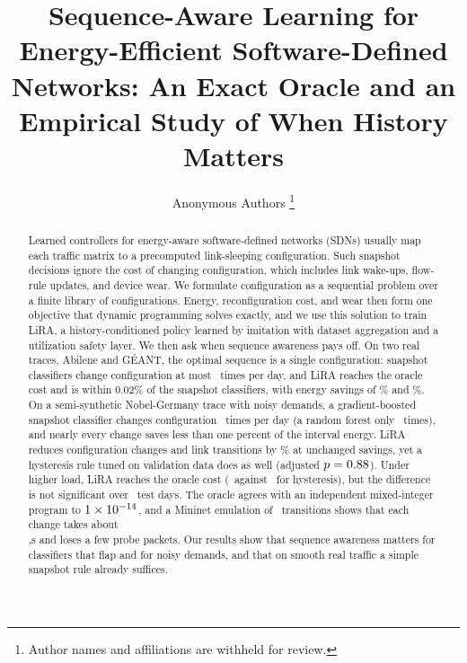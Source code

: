 \documentclass[journal]{IEEEtran}
\begin{document}
\title{Sequence-Aware Learning for Energy-Efficient Software-Defined Networks: An Exact Oracle and an Empirical Study of When History Matters}

\author{Anonymous Authors%
\thanks{Author names and affiliations are withheld for review.}}


\maketitle
\IEEEpeerreviewmaketitle

\begin{abstract}
Learned controllers for energy-aware software-defined networks (SDNs) usually map each traffic matrix to a precomputed link-sleeping configuration. Such snapshot decisions ignore the cost of changing configuration, which includes link wake-ups, flow-rule updates, and device wear. We formulate configuration as a sequential problem over a finite library of configurations. Energy, reconfiguration cost, and wear then form one objective that dynamic programming solves exactly, and we use this solution to train LiRA, a history-conditioned policy learned by imitation with dataset aggregation and a utilization safety layer. We then ask when sequence awareness pays off. On two real traces, Abilene and G\'{E}ANT, the optimal sequence is a single configuration: snapshot classifiers change configuration at most \abiBFourchg\ times per day, and LiRA reaches the oracle cost and is within 0.02\% of the snapshot classifiers, with energy savings of \abiSav\% and \geaSav\%. On a semi-synthetic Nobel-Germany trace with noisy demands, a gradient-boosted snapshot classifier changes configuration \nobBFourchg\ times per day (a random forest only \modRfChg\ times), and nearly every change saves less than one percent of the interval energy. LiRA reduces configuration changes and link transitions by \nobY\% at unchanged savings, yet a hysteresis rule tuned on validation data does as well (adjusted $p=0.88$). Under higher load, LiRA reaches the oracle cost (\nobhlJLiRA\ against \nobhlJBSix\ for hysteresis), but the difference is not significant over \nobTestDays\ test days. The oracle agrees with an independent mixed-integer program to $1\times10^{-14}$, and a Mininet emulation of \emuTrans\ transitions shows that each change takes about \emuTransS\\,s and loses a few probe packets. Our results show that sequence awareness matters for classifiers that flap and for noisy demands, and that on smooth real traffic a simple snapshot rule already suffices.
\end{abstract}
\end{document}
